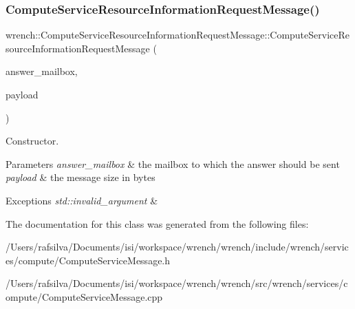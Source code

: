 \subsubsection{\texorpdfstring{Compute\+Service\+Resource\+Information\+Request\+Message()}{ComputeServiceResourceInformationRequestMessage()}}
{\footnotesize\ttfamily wrench\+::\+Compute\+Service\+Resource\+Information\+Request\+Message\+::\+Compute\+Service\+Resource\+Information\+Request\+Message (\begin{DoxyParamCaption}\item[{std\+::string}]{answer\+\_\+mailbox,  }\item[{double}]{payload }\end{DoxyParamCaption})}



Constructor. 


\begin{DoxyParams}{Parameters}
{\em answer\+\_\+mailbox} & the mailbox to which the answer should be sent \\
\hline
{\em payload} & the message size in bytes\\
\hline
\end{DoxyParams}

\begin{DoxyExceptions}{Exceptions}
{\em std\+::invalid\+\_\+argument} & \\
\hline
\end{DoxyExceptions}


The documentation for this class was generated from the following files\+:\begin{DoxyCompactItemize}
\item 
/\+Users/rafsilva/\+Documents/isi/workspace/wrench/wrench/include/wrench/services/compute/Compute\+Service\+Message.\+h\item 
/\+Users/rafsilva/\+Documents/isi/workspace/wrench/wrench/src/wrench/services/compute/Compute\+Service\+Message.\+cpp\end{DoxyCompactItemize}
